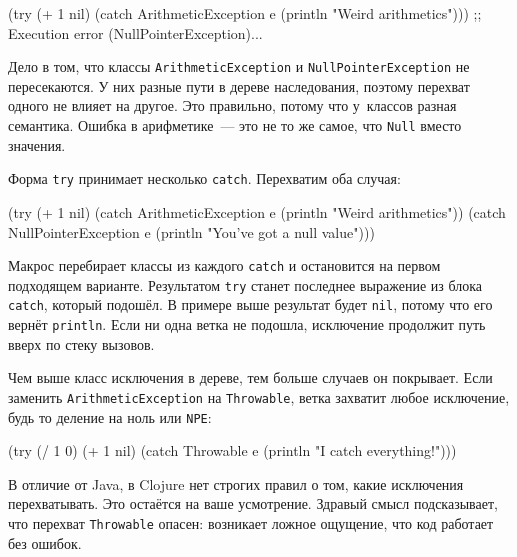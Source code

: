 \else

\begin{english}
  \begin{clojure}
(try
  (+ 1 nil)
  (catch ArithmeticException e
    (println "Weird arithmetics")))
;; Execution error (NullPointerException)...
  \end{clojure}
\end{english}

\fi


\noindent
Дело в том, что классы \verb|ArithmeticException| и
\verb|NullPointerException| не пересекаются. У них разные пути в дереве
наследования, поэтому перехват одного не влияет на другое. Это правильно, потому
что у~классов разная семантика. Ошибка в арифметике~--- это не то же самое, что
\verb|Null| вместо значения.


Форма \verb|try| принимает несколько \verb|catch|. Перехватим оба случая:

\begin{english}
  \begin{clojure}
(try
  (+ 1 nil)
  (catch ArithmeticException e
    (println "Weird arithmetics"))
  (catch NullPointerException e
    (println "You've got a null value")))
  \end{clojure}
\end{english}

Макрос перебирает классы из каждого \verb|catch| и остановится на первом
подходящем варианте. Результатом \verb|try| станет последнее выражение из
блока \verb|catch|, который подошёл. В примере выше результат будет
\verb|nil|, потому что его вернёт \verb|println|. Если ни одна ветка не
подошла, исключение продолжит путь вверх по стеку вызовов.


Чем выше класс исключения в дереве, тем больше случаев он покрывает. Если
заменить \verb|ArithmeticException| на \verb|Throwable|, ветка захватит
любое исключение, будь то деление на ноль или \verb|NPE|:

\begin{english}
  \begin{clojure}
(try
  (/ 1 0)
  (+ 1 nil)
  (catch Throwable e
    (println "I catch everything!")))
  \end{clojure}
\end{english}

В отличие от Java, в Clojure нет строгих правил о том, какие исключения
перехватывать. Это остаётся на ваше усмотрение. Здравый смысл подсказывает, что
перехват \verb|Throwable| опасен: возникает ложное ощущение, что код работает
без ошибок.

